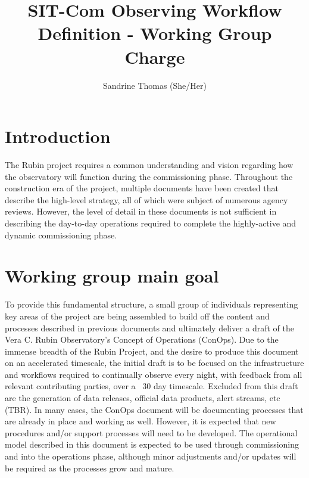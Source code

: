 \documentclass[SE,authoryear,toc]{lsstdoc}
\title{SIT-Com Observing Workflow Definition  - Working Group Charge}
\author{%
Sandrine Thomas (She/Her)
}
\date{\vcsDate}
\begin{document}
\maketitle



\section{Introduction}
The Rubin project requires a common understanding and vision regarding how the observatory will function during the commissioning phase. Throughout the construction era of the project, multiple documents have been created that describe the high-level strategy, all of which were subject of numerous agency reviews. However, the level of detail in these documents is not sufficient in describing the day-to-day operations required to complete the highly-active and dynamic commissioning phase. 

\section{Working group main goal}
To provide this fundamental structure, a small group of individuals representing key areas of the project are being assembled to build off the content and processes described in previous documents and ultimately deliver a draft of the Vera C. Rubin Observatory’s Concept of Operations (ConOps). Due to the immense breadth of the Rubin Project, and the desire to produce this document on an accelerated timescale, the initial draft is to be focused on the infrastructure and workflows required to continually observe every night, with feedback from all relevant contributing parties, over a ~30 day timescale. Excluded from this draft are the generation of data releases, official data products, alert streams, etc (TBR). In many cases, the ConOps document will be documenting processes that are already in place and working as well. However, it is expected that new procedures and/or support processes will need to be developed. The operational model described in this document is expected to be used through commissioning and into the operations phase, although minor adjustments and/or updates will be required as the processes grow and mature.
\end{document}
